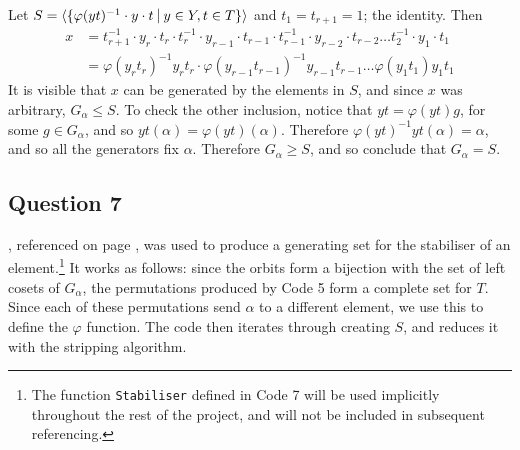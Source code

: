 \documentclass[10pt,a4paper,notitlepage]{article}
\begin{document}
Let $S=\langle \lbrace \varphi(yt)^{-1}\cdot y\cdot t \,\,\vline \, \, y\in Y, t \in T\rbrace\rangle$ and $t_{1}=t_{r+1}=1$; the identity. Then
\begin{equation*}
\begin{aligned}
x &= t_{r+1}^{-1}\cdot y_{r}\cdot t_{r}\cdot t_{r}^{-1}\cdot y_{r-1}\cdot t_{r-1} \cdot t_{r-1}^{-1} \cdot y_{r-2} \cdot t_{r-2} \hdots t_{2}^{-1}\cdot y_{1}\cdot t_{1}\\
&=\varphi(y_{r}t_{r})^{-1}y_{r}t_{r}\cdot \varphi(y_{r-1}t_{r-1})^{-1}y_{r-1}t_{r-1}\hdots \varphi(y_{1}t_{1})y_{1}t_{1}
\end{aligned}
\end{equation*}
It is visible that $x$ can be generated by the elements in $S$,  and since $x$ was arbitrary, $G_{\alpha}\leq S$. To check the other inclusion, notice that $yt=\varphi(yt)g$, for some $g\in G_{\alpha}$, and so $yt(\alpha)=\varphi(yt)(\alpha)$. Therefore $\varphi(yt)^{-1}yt(\alpha)=\alpha$, and so all the generators fix $\alpha$. Therefore $G_{\alpha}\geq S$, and so conclude that $G_{\alpha}=S$.\\

\subsection*{\centering Question 7}
, referenced on page \pageref{cd:7}, was used to produce a generating set for the stabiliser of an element.\footnote{The function \texttt{Stabiliser} defined in Code 7 will be used implicitly throughout the rest of the project, and will not be included in subsequent referencing.} It works as follows: since the orbits form a bijection with the set of left cosets of $G_{\alpha}$, the permutations produced by Code 5 form a complete set for $T$.  Since each of these permutations send $\alpha$ to a different element, we use this to define the $\varphi$ function. The code then iterates through creating $S$, and reduces it with the stripping algorithm. \\
\end{document}

